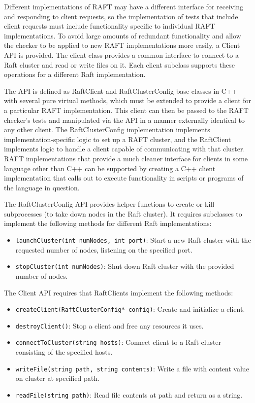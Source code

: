 \documentclass[UTF8]{article}
\begin{document}
Different implementations of RAFT may have a different interface for receiving and responding to client requests, so the implementation of tests that include client requests must include functionality specific to individual RAFT implementations. To avoid large amounts of redundant functionality and allow the checker to be applied to new RAFT implementations more easily, a Client API is provided. The client class provides a common interface to connect to a Raft cluster and read or write files on it. Each client subclass supports these operations for a different Raft implementation.

The API is defined as RaftClient and RaftClusterConfig base classes in C++ with several pure virtual methods, which must be extended to provide a client for a particular RAFT implementation. This client can then be passed to the RAFT checker's tests and manipulated via the API in a manner externally identical to any other client. The RaftClusterConfig implementation implements implementation-specific logic to set up a RAFT cluster, and the RaftClient implements logic to handle a client capable of communicating with that cluster. RAFT implementations that provide a much cleaner interface for clients in some language other than C++ can be supported by creating a C++ client implementation that calls out to execute functionality in scripts or programs of the language in question.

The RaftClusterConfig API provides helper functions to create or kill subprocesses (to take down nodes in the Raft cluster). It requires subclasses to implement the following methods for different Raft implementations:

\begin{itemize}
\item \texttt{launchCluster(int numNodes, int port)}: Start a new Raft cluster with the requested number of nodes, listening on the specified port.
\item \texttt{stopCluster(int numNodes)}: Shut down Raft cluster with the provided number of nodes.
\end{itemize}

The Client API requires that RaftClients implement the following methods:

\begin{itemize}
\item \texttt{createClient(RaftClusterConfig* config)}: Create and initialize a client.
\item \texttt{destroyClient()}: Stop a client and free any resources it uses.
\item \texttt{connectToCluster(string hosts)}: Connect client to a Raft cluster consisting of the specified hosts.
\item \texttt{writeFile(string path, string contents)}: Write a file with content value on cluster at specified path.
\item \texttt{readFile(string path)}: Read file contents at path and return as a string.
\end{itemize}
\end{document}
